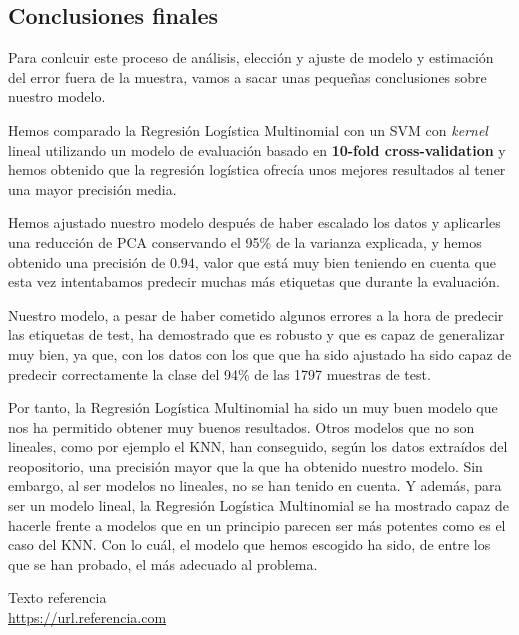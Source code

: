 \documentclass[11pt,a4paper]{article}
\begin{document}
    \subsection{Conclusiones finales}\label{conclusiones-finales}

Para conlcuir este proceso de análisis, elección y ajuste de modelo y estimación
del error fuera de la muestra, vamos a sacar unas pequeñas conclusiones sobre nuestro
modelo.

Hemos comparado la Regresión Logística Multinomial con un SVM con
\emph{kernel} lineal utilizando un modelo de evaluación basado en
\textbf{10-fold cross-validation} y hemos obtenido que la regresión
logística ofrecía unos mejores resultados al tener una mayor precisión
media.

Hemos ajustado nuestro modelo después de haber escalado los datos y
aplicarles una reducción de PCA conservando el 95\% de la varianza
explicada, y hemos obtenido una precisión de \(0.94\), valor que está
muy bien teniendo en cuenta que esta vez intentabamos predecir muchas
más etiquetas que durante la evaluación.

Nuestro modelo, a pesar de haber cometido algunos errores a la hora de
predecir las etiquetas de test, ha demostrado que es robusto y que es
capaz de generalizar muy bien, ya que, con los datos con los que que ha
sido ajustado ha sido capaz de predecir correctamente la clase del 94\%
de las 1797 muestras de test.

Por tanto, la Regresión Logística Multinomial ha sido un muy buen modelo
que nos ha permitido obtener muy buenos resultados. Otros modelos que no
son lineales, como por ejemplo el KNN, han conseguido, según los datos
extraídos del reopositorio, una precisión mayor que la que ha obtenido
nuestro modelo. Sin embargo, al ser modelos no lineales, no se han
tenido en cuenta. Y además, para ser un modelo lineal, la Regresión
Logística Multinomial se ha mostrado capaz de hacerle frente a modelos
que en un principio parecen ser más potentes como es el caso del KNN.
Con lo cuál, el modelo que hemos escogido ha sido, de entre los que se
han probado, el más adecuado al problema.

\newpage

\begin{thebibliography}{5}

Texto referencia
\\\url{https://url.referencia.com}

\end{thebibliography}
\end{document}
